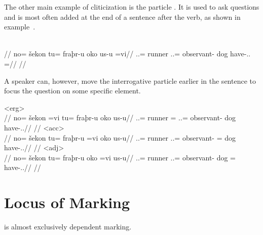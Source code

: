The other main example of cliticization is the particle . It is used to ask questions and is most often added at the end of a sentence after the verb, as shown in example~.

	\begingl
		\glpreamble{}\\
		//
		\gla no= šekon tu= fraþr-u oko us-u =vi//
		\glb \An.\Sg.\Top{}= runner \An.\Sg.\Acc{}= observant-\An{} dog have-\Ind.\Npst.\Ipfv{} =\Int//
		\glft {}//
	\endgl
\xe

A speaker can, however, move the interrogative particle earlier in the sentence to focus the question on some specific element.

	\a<erg>\begingl
		\glpreamble{}\\
		//
		\gla no= šekon =vi tu= fraþr-u oko us-u//
		\glb \An.\Sg.\Top{}= runner =\Int{} \An.\Sg.\Acc{}= observant-\An{} dog have-\Ind.\Npst.\Ipfv//
		\glft {}//
	\endgl
	\a<acc>\begingl
		\glpreamble{}\\
		//
		\gla no= šekon tu= fraþr-u =vi oko us-u//
		\glb \An.\Sg.\Top{}= runner \An.\Sg.\Acc{}= observant-\An{} =\Int{} dog have-\Ind.\Npst.\Ipfv//
		\glft {}//
	\endgl
	\a<adj>\begingl
		\glpreamble{}\\
		//
		\gla no= šekon tu= fraþr-u oko =vi us-u//
		\glb \An.\Sg.\Top{}= runner \An.\Sg.\Acc{}= observant-\An{} dog =\Int{} have-\Ind.\Npst.\Ipfv//
		\glft {}//
	\endgl
\xe


\section{Locus of Marking}
\label{sec:tvk-locus}

\langtvk{} is almost exclusively dependent marking.

